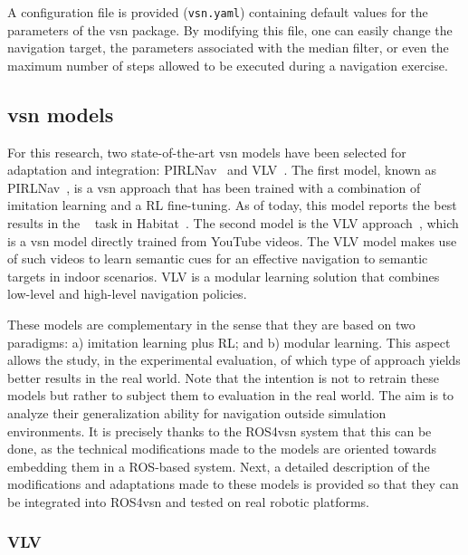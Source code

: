 A configuration file is provided (\texttt{vsn.yaml}) containing default values for the parameters of the \acrshort{vsn} package.
By modifying this file, one can easily change the navigation target, the parameters associated with the median filter, or even the maximum number of steps allowed to be executed during a navigation exercise.


\subsection{\acrshort{vsn} models}\label{subsec:vsn_models}
For this research, two state-of-the-art \acrshort{vsn} models have been selected for adaptation and integration: PIRLNav~\cite{ramrakhya2023} and VLV~\cite{chang2020}.
The first model, known as PIRLNav~\cite{ramrakhya2023}, is a \acrshort{vsn} approach that has been trained with a combination of imitation learning and a RL fine-tuning.
As of today, this model reports the best results in the \objnav~\cite{batra2020} task in Habitat~\cite{NEURIPS2021_021bbc7e}.
The second model is the VLV approach~\cite{chang2020}, which is a \acrshort{vsn} model directly trained from YouTube videos.
The VLV model makes use of such videos to learn semantic cues for an effective navigation to semantic targets in indoor scenarios.
VLV is a modular learning solution that combines low-level and high-level navigation policies.

These models are complementary in the sense that they are based on two paradigms: a) imitation learning plus RL; and b) modular learning.
This aspect allows the study, in the experimental evaluation, of which type of approach yields better results in the real world.
Note that the intention is not to retrain these models but rather to subject them to evaluation in the real world.
The aim is to analyze their generalization ability for navigation outside simulation environments.
It is precisely thanks to the ROS4\acrshort{vsn} system that this can be done, as the technical modifications made to the models are oriented towards embedding them in a ROS-based system.
Next, a detailed description of the modifications and adaptations made to these models is provided so that they can be integrated into ROS4\acrshort{vsn} and tested on real robotic platforms.

\subsubsection{VLV}

